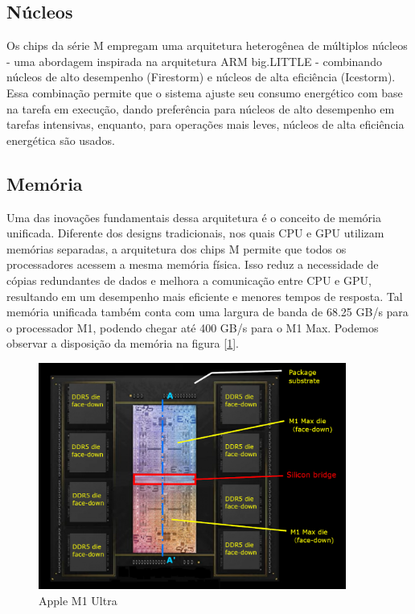 \documentclass[a4paper,times,12pt]{article}
\begin{document}
\subsection{Núcleos}
\hspace{+15pt}
Os chips da série M empregam uma arquitetura heterogênea de múltiplos núcleos - uma abordagem inspirada na arquitetura ARM big.LITTLE - combinando núcleos de alto desempenho (Firestorm) e núcleos de alta eficiência (Icestorm). Essa combinação permite que o sistema ajuste seu consumo energético com base na tarefa em execução, dando preferência para núcleos de alto desempenho em tarefas intensivas, enquanto, para operações mais leves, núcleos de alta eficiência energética são usados. 


\subsection{Memória}
\hspace{+15pt}
Uma das inovações fundamentais dessa arquitetura é o conceito de memória unificada. Diferente dos designs tradicionais, nos quais CPU e GPU utilizam memórias separadas, a arquitetura dos chips M permite que todos os processadores acessem a mesma memória física. Isso reduz a necessidade de cópias redundantes de dados e melhora a comunicação entre CPU e GPU, resultando em um desempenho mais eficiente e menores tempos de resposta. Tal memória unificada também conta com uma largura de banda de 68.25 GB/s para o processador M1, podendo chegar até 400 GB/s para o M1 Max. Podemos observar a disposição da memória na figura [\ref{fig:apple_m1_ultra}].

\begin{figure}[ht]
    \centering
    \includegraphics[width=0.9\textwidth]{./apple-m1-ultra.png}
    \caption{Apple M1 Ultra}
    \label{fig:apple_m1_ultra}
\end{figure}
\end{document}
